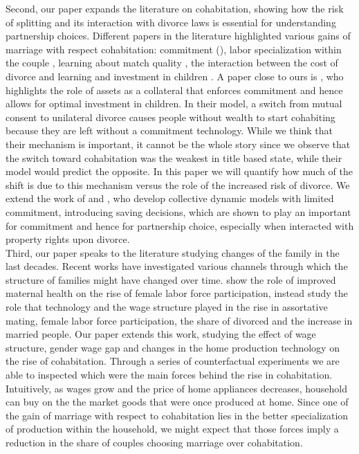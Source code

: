 \documentclass[12pt]{article}
\numberwithin{table}{section}
\begin{document}
Second, our paper expands the literature on cohabitation, showing how the risk of splitting and its interaction with divorce laws is essential for understanding partnership choices. Different papers in the literature highlighted various gains of marriage with respect cohabitation: commitment (\cite{matouschek2008}), labor specialization within the couple \cite{gemici2014}, learning about match quality \cite{brien2006}, the interaction between the cost of divorce and learning \cite{blasutto2020} and  investment in children \cite{lafortune2019}. A paper close to ours is \cite{lafortune2019}, who highlights the role of assets as a collateral that enforces commitment and hence allows for optimal investment in children. In their model, a switch from mutual consent to unilateral divorce causes people without wealth to start cohabiting because they are left without a commitment technology. While we think that their mechanism is important, it cannot be the whole story since we observe that the switch toward cohabitation was the weakest in title based state, while their model would predict the opposite. In this paper we will quantify how much of the shift is due to this mechanism versus the role of the increased risk of divorce. We extend the work of \cite{gemici2014} and \cite{blasutto2020}, who develop collective dynamic models with limited commitment, introducing saving decisions, which are shown to play an important for commitment and hence for partnership choice, especially when interacted with property rights upon divorce.\\
Third, our paper speaks to the literature studying changes of the family in the last decades. Recent works have investigated various channels through which the structure of families might have changed over time. \cite{albanesi2016} show the role of improved maternal health on the rise of female labor force participation, \cite{greenwood2016} instead study the role that technology and the wage structure played in the rise in assortative mating, female labor force participation, the share of divorced and the increase in married people. Our paper extends this work, studying the effect of wage structure, gender wage gap and changes in the home production technology on the rise of cohabitation. Through a series of counterfactual experiments we are able to inspected which were the main forces behind the rise in cohabitation. Intuitively, as wages grow and the price of home appliances decreases, household can buy on the the market goods that were once produced at home. Since one of the gain of marriage with respect to cohabitation lies in the better specialization of production within the household, we might expect that those forces imply a reduction in the share of couples choosing marriage over cohabitation.
\end{document}
